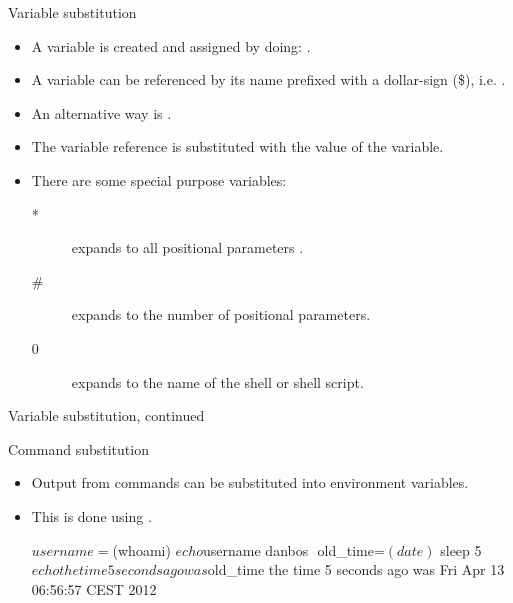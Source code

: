 \documentclass[handout]{beamer}
\begin{document}
\begin{frame}{Variable substitution}
	\begin{itemize}
		\item<1-3> A variable is created and assigned by doing: 
			.

		\item<2-3> A variable can be referenced by its name prefixed with 
			a dollar-sign (\$), i.e. .

		\item<2-3> An alternative way is .

		\item<3> The variable reference is substituted with the value of the 
			variable.

		\item<4> There are some special purpose variables:
			\begin{description}
				\item[*] expands to all positional parameters .
				\item[\#] expands to the number of positional parameters.
				\item[0] expands to the name of the shell or shell script.
			\end{description}

	\end{itemize}
\end{frame}

\begin{frame}[fragile]{Variable substitution, continued}
\end{frame}

\begin{frame}[fragile]{Command substitution}
	\begin{itemize}
		\item<1-2> Output from commands can be substituted into environment 
			variables.

		\item<2> This is done using .
      \begin{terminal}
$ username=$(whoami)
$ echo $username
danbos
$
$ old_time=$(date)
$ sleep 5
$ echo the time 5 seconds ago was $old_time
the time 5 seconds ago was Fri Apr 13 06:56:57 CEST 2012
$
$
      \end{terminal}
	\end{itemize}
\end{frame}
\end{document}
